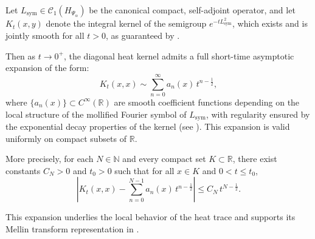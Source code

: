 \begin{lemma}
\label{lem:hk_expansion_uniform}
Let \( L_{\mathrm{sym}} \in \mathcal{C}_1(H_{\Psi_\alpha}) \) be the canonical compact, self-adjoint operator, and let \( K_t(x,y) \) denote the integral kernel of the semigroup \( e^{-t L_{\mathrm{sym}}^2} \), which exists and is jointly smooth for all \( t > 0 \), as guaranteed by .

Then as \( t \to 0^+ \), the diagonal heat kernel admits a full short-time asymptotic expansion of the form:
\[
K_t(x,x) \sim \sum_{n=0}^\infty a_n(x)\, t^{n - \frac{1}{2}},
\]
where \( \{ a_n(x) \} \subset C^\infty(\mathbb{R}) \) are smooth coefficient functions depending on the local structure of the mollified Fourier symbol of \( L_{\mathrm{sym}} \), with regularity ensured by the exponential decay properties of the kernel (see ). This expansion is valid uniformly on compact subsets of \( \mathbb{R} \).

\medskip
\noindent
More precisely, for each \( N \in \mathbb{N} \) and every compact set \( K \subset \mathbb{R} \), there exist constants \( C_N > 0 \) and \( t_0 > 0 \) such that for all \( x \in K \) and \( 0 < t \le t_0 \),
\[
\left| K_t(x,x) - \sum_{n=0}^{N-1} a_n(x)\, t^{n - \frac{1}{2}} \right| \le C_N\, t^{N - \frac{1}{2}}.
\]

\medskip
\noindent
This expansion underlies the local behavior of the heat trace and supports its Mellin transform representation in .
\end{lemma}
